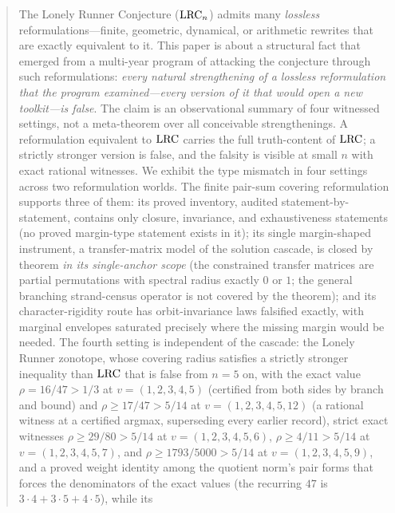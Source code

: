 
\begin{abstract}
\noindent
The Lonely Runner Conjecture ($\lrc_n$) admits many \emph{lossless}
reformulations---finite, geometric, dynamical, or arithmetic rewrites that
are exactly equivalent to it. This paper is about a structural fact that
emerged from a multi-year program of attacking the conjecture through such
reformulations: \emph{every natural strengthening of a lossless
reformulation that the program examined---every version of it that would
open a new toolkit---is false}. The claim is an observational summary of
four witnessed settings, not a meta-theorem over all conceivable
strengthenings. A reformulation equivalent to $\lrc$ carries the full
truth-content of $\lrc$; a strictly stronger version is false, and the
falsity is visible at small $n$ with exact rational witnesses. We exhibit
the type mismatch in four settings across two reformulation worlds. The
finite pair-sum covering reformulation supports three of them: its proved
inventory, audited statement-by-statement, contains only closure,
invariance, and exhaustiveness statements (no proved margin-type statement
exists in it); its single margin-shaped instrument, a transfer-matrix
model of the solution cascade, is closed by theorem \emph{in its
single-anchor scope} (the constrained transfer matrices are partial
permutations with spectral radius exactly $0$ or $1$; the general
branching strand-census operator is not covered by the theorem); and its
character-rigidity route has orbit-invariance laws falsified exactly, with
marginal envelopes saturated precisely where the missing margin would be
needed. The fourth setting is independent of the
cascade: the Lonely Runner zonotope, whose covering radius satisfies a
strictly stronger inequality than $\lrc$ that is false from $n=5$ on,
with the exact value $\rho=16/47>1/3$ at
$v=(1,2,3,4,5)$ (certified from both sides by branch and bound) and
$\rho\ge17/47>5/14$ at $v=(1,2,3,4,5,12)$ (a rational witness at a
certified argmax, superseding every earlier record), strict exact
witnesses $\rho\ge
29/80>5/14$ at $v=(1,2,3,4,5,6)$, $\rho\ge 4/11>5/14$ at
$v=(1,2,3,4,5,7)$, and $\rho\ge 1793/5000>5/14$ at $v=(1,2,3,4,5,9)$,
and a proved weight identity among the quotient norm's pair forms that
forces the denominators of the exact values (the recurring $47$ is
$3\cdot4+3\cdot5+4\cdot5$), while its

\end{abstract}
